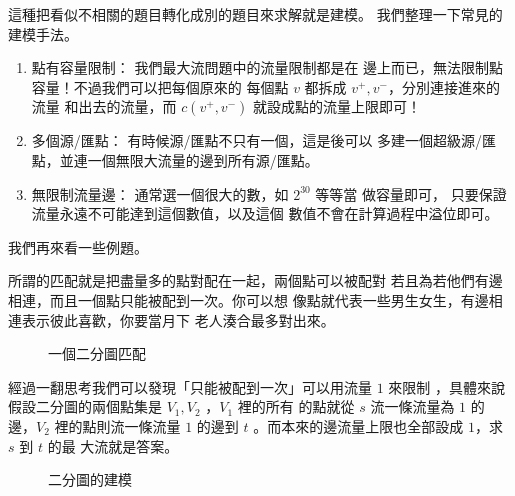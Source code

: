 \documentclass[a4paper,12pt]{book}
\begin{document}
這種把看似不相關的題目轉化成別的題目來求解就是建模。
我們整理一下常見的建模手法。
\begin{enumerate}
  \item 點有容量限制： 我們最大流問題中的流量限制都是在
    邊上而已，無法限制點容量！不過我們可以把每個原來的
    每個點 $v$ 都拆成 $v^+, v^-$，分別連接進來的流量
    和出去的流量，而 $c(v^+, v^-)$ 就設成點的流量上限即可！

  \item 多個源/匯點： 有時候源/匯點不只有一個，這是後可以
    多建一個超級源/匯點，並連一個無限大流量的邊到所有源/匯點。

  \item 無限制流量邊： 通常選一個很大的數，如 $2^{30}$ 等等當
    做容量即可， 只要保證流量永遠不可能達到這個數值，以及這個
    數值不會在計算過程中溢位即可。
\end{enumerate}
我們再來看一些例題。


所謂的匹配就是把盡量多的點對配在一起，兩個點可以被配對
若且為若他們有邊相連，而且一個點只能被配到一次。你可以想
像點就代表一些男生女生，有邊相連表示彼此喜歡，你要當月下
老人湊合最多對出來。

\begin{figure}[H]
  \centering
  
  \caption{一個二分圖匹配}
\end{figure}

經過一翻思考我們可以發現「只能被配到一次」可以用流量 $1$ 來限制
，具體來說假設二分圖的兩個點集是 $V_1, V_2$ ，$V_1$ 裡的所有
的點就從 $s$ 流一條流量為 $1$ 的邊，$V_2$ 裡的點則流一條流量 $1$ 
的邊到 $t$ 。而本來的邊流量上限也全部設成 $1$，求 $s$ 到 $t$ 的最
大流就是答案。

\begin{figure}[H]
  \centering
  
  \caption{二分圖的建模}
\end{figure}
\end{document}
